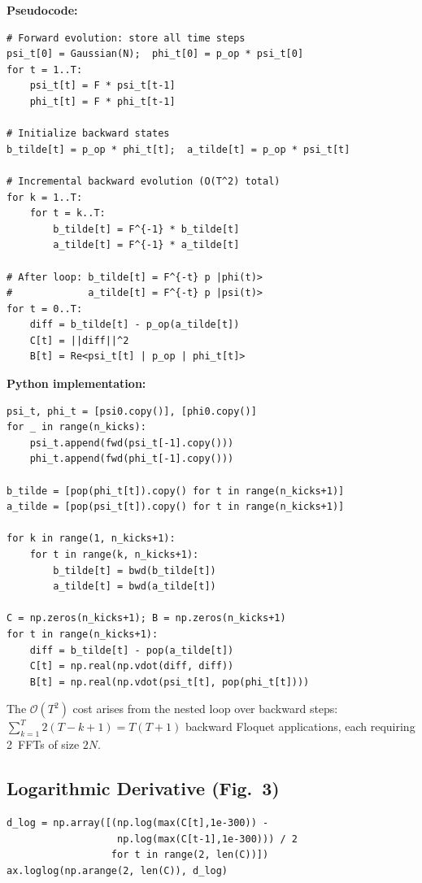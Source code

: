 \documentclass[11pt,a4paper]{article}
\begin{document}
\noindent\textbf{Pseudocode:}
\begin{lstlisting}
# Forward evolution: store all time steps
psi_t[0] = Gaussian(N);  phi_t[0] = p_op * psi_t[0]
for t = 1..T:
    psi_t[t] = F * psi_t[t-1]
    phi_t[t] = F * phi_t[t-1]

# Initialize backward states
b_tilde[t] = p_op * phi_t[t];  a_tilde[t] = p_op * psi_t[t]

# Incremental backward evolution (O(T^2) total)
for k = 1..T:
    for t = k..T:
        b_tilde[t] = F^{-1} * b_tilde[t]
        a_tilde[t] = F^{-1} * a_tilde[t]

# After loop: b_tilde[t] = F^{-t} p |phi(t)>
#             a_tilde[t] = F^{-t} p |psi(t)>
for t = 0..T:
    diff = b_tilde[t] - p_op(a_tilde[t])
    C[t] = ||diff||^2
    B[t] = Re<psi_t[t] | p_op | phi_t[t]>
\end{lstlisting}

\noindent\textbf{Python implementation:}
\begin{lstlisting}
psi_t, phi_t = [psi0.copy()], [phi0.copy()]
for _ in range(n_kicks):
    psi_t.append(fwd(psi_t[-1].copy()))
    phi_t.append(fwd(phi_t[-1].copy()))

b_tilde = [pop(phi_t[t]).copy() for t in range(n_kicks+1)]
a_tilde = [pop(psi_t[t]).copy() for t in range(n_kicks+1)]

for k in range(1, n_kicks+1):
    for t in range(k, n_kicks+1):
        b_tilde[t] = bwd(b_tilde[t])
        a_tilde[t] = bwd(a_tilde[t])

C = np.zeros(n_kicks+1); B = np.zeros(n_kicks+1)
for t in range(n_kicks+1):
    diff = b_tilde[t] - pop(a_tilde[t])
    C[t] = np.real(np.vdot(diff, diff))
    B[t] = np.real(np.vdot(psi_t[t], pop(phi_t[t])))
\end{lstlisting}

The $\mathcal{O}(T^{2})$ cost arises from the nested loop over backward steps: $\sum_{k=1}^{T}2(T-k+1)=T(T+1)$ backward Floquet applications, each requiring 2~FFTs of size $2N$.

\subsection{Logarithmic Derivative (Fig.~3)}

\begin{lstlisting}
d_log = np.array([(np.log(max(C[t],1e-300)) -
                   np.log(max(C[t-1],1e-300))) / 2
                  for t in range(2, len(C))])
ax.loglog(np.arange(2, len(C)), d_log)
\end{lstlisting}
\end{document}
